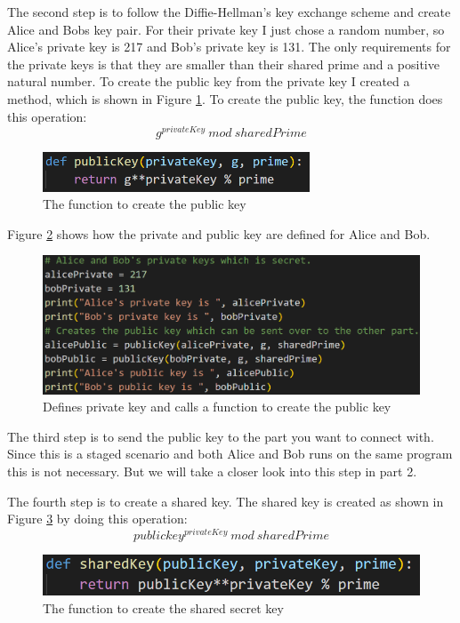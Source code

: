 \documentclass[12pt, letterpaper]{article}
\begin{document}
The second step is to follow the Diffie-Hellman's key exchange scheme and create Alice and Bobs key pair. For their private key I just chose a random number, so Alice's private key is 217 and Bob's private key is 131. The only requirements for the private keys is that they are smaller than their shared prime and a positive natural number. To create the public key from the private key I created a method, which is shown in Figure \ref{fig:step2_func}. To create the public key, the function does this operation: $$g^{privateKey}\ mod\ sharedPrime$$

\begin{figure}[H]
  \includegraphics[width=300px]{code_snippets/step2_func.PNG}
  \caption{The function to create the public key}
  \label{fig:step2_func}
\end{figure}

Figure \ref{fig:step2} shows how the private and public key are defined for Alice and Bob.

\begin{figure}[H]
  \includegraphics[width=\linewidth]{code_snippets/step2.PNG}
  \caption{Defines private key and calls a function to create the public key}
  \label{fig:step2}
\end{figure}

The third step is to send the public key to the part you want to connect with. Since this is a staged scenario and both Alice and Bob runs on the same program this is not necessary. But we will take a closer look into this step in part 2. 

The fourth step is to create a shared key. The shared key is created as shown in Figure \ref{fig:step4_func} by doing this operation: $$publickey^{privateKey} \ mod \ sharedPrime$$

\begin{figure}[H]
  \includegraphics[width=\linewidth]{code_snippets/step4_func.PNG}
  \caption{The function to create the shared secret key}
  \label{fig:step4_func}
\end{figure}
\end{document}
